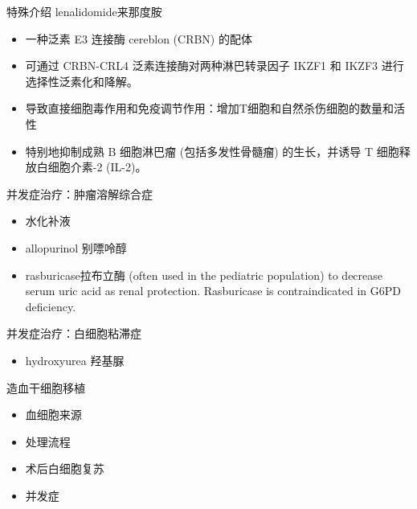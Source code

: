 \documentclass[
  ignorenonframetext,
]{beamer}
\providecommand{\tightlist}{%
  \setlength{\itemsep}{0pt}\setlength{\parskip}{0pt}}
\begin{document}
\begin{frame}
\begin{block}{特殊介绍 lenalidomide来那度胺}
\protect\hypertarget{ux7279ux6b8aux4ecbux7ecd-lenalidomideux6765ux90a3ux5ea6ux80fa}{}
\begin{itemize}
\item
  一种泛素 E3 连接酶 cereblon (CRBN) 的配体
\item
  可通过 CRBN-CRL4 泛素连接酶对两种淋巴转录因子 IKZF1 和 IKZF3
  进行选择性泛素化和降解。
\item
  导致直接细胞毒作用和免疫调节作用：增加T细胞和自然杀伤细胞的数量和活性
\item
  特别地抑制成熟 B 细胞淋巴瘤 (包括多发性骨髓瘤) 的生长，并诱导 T
  细胞释放白细胞介素-2 (IL-2)。
\end{itemize}
\end{block}
\end{frame}

\begin{frame}
\begin{block}{并发症治疗：肿瘤溶解综合症}
\protect\hypertarget{ux5e76ux53d1ux75c7ux6cbbux7597ux80bfux7624ux6eb6ux89e3ux7efcux5408ux75c7}{}
\begin{itemize}
\item
  水化补液
\item
  allopurinol 别嘌呤醇
\item
  rasburicase拉布立酶 (often used in the pediatric population) to
  decrease serum uric acid as renal protection. Rasburicase is
  contraindicated in G6PD deficiency.
\end{itemize}
\end{block}
\end{frame}

\begin{frame}
\begin{block}{并发症治疗：白细胞粘滞症}
\protect\hypertarget{ux5e76ux53d1ux75c7ux6cbbux7597ux767dux7ec6ux80deux7c98ux6edeux75c7}{}
\begin{itemize}
\tightlist
\item
  hydroxyurea 羟基脲
\end{itemize}
\end{block}
\end{frame}

\begin{frame}
\begin{block}{造血干细胞移植}
\protect\hypertarget{ux9020ux8840ux5e72ux7ec6ux80deux79fbux690d}{}
\begin{itemize}
\item
  血细胞来源
\item
  处理流程
\item
  术后白细胞复苏
\item
  并发症
\end{itemize}
\end{block}
\end{frame}
\end{document}
